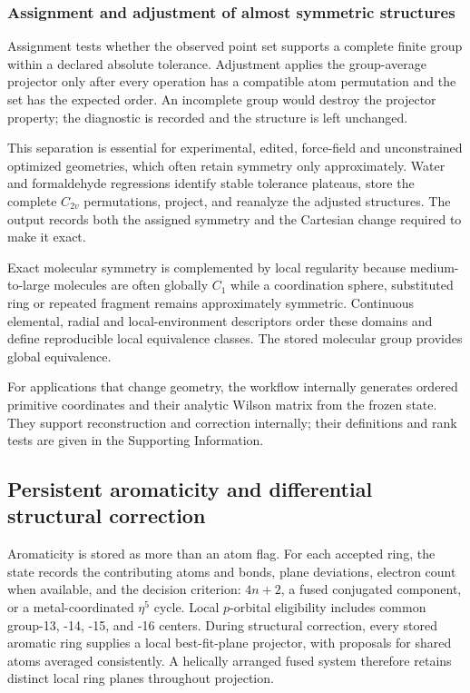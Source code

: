 \documentclass[journal=jctcce,manuscript=article]{achemso}
\begin{document}
\subsubsection{Assignment and adjustment of almost symmetric structures}

Assignment tests whether the observed point set supports a complete finite
group within a declared absolute tolerance.  Adjustment applies the
group-average projector only after every operation has a compatible atom
permutation and the set has the expected order.  An incomplete group would
destroy the projector property; the diagnostic is recorded and the structure
is left unchanged.

This separation is essential for experimental, edited, force-field and
unconstrained optimized geometries, which often retain symmetry only
approximately.  Water and formaldehyde regressions identify stable tolerance
plateaus, store the complete $C_{2v}$ permutations, project, and reanalyze the
adjusted structures.  The output records both the assigned symmetry and the
Cartesian change required to make it exact.

Exact molecular symmetry is complemented by local regularity because
medium-to-large molecules are often globally $C_1$ while a coordination sphere, substituted
ring or repeated fragment remains approximately symmetric.  Continuous
elemental, radial and local-environment descriptors order these
domains and define reproducible local equivalence classes.  The stored
molecular group provides global equivalence.

For applications that change geometry, the workflow internally generates ordered
primitive coordinates and their analytic Wilson matrix from the frozen state.
They support reconstruction and correction internally; their definitions and
rank tests are given in the Supporting Information.

\subsection{Persistent aromaticity and differential structural correction}

Aromaticity is stored as more than an atom flag.  For each accepted ring,
the state records the contributing atoms and bonds, plane deviations, electron
count when available, and the decision criterion: $4n+2$, a fused conjugated
component, or a metal-coordinated $\eta^5$ cycle.  Local $p$-orbital eligibility
includes common group-13, -14, -15, and -16 centers.  During structural
correction, every stored aromatic ring supplies a local best-fit-plane
projector, with proposals for shared atoms averaged consistently.  A helically arranged fused
system therefore retains distinct local ring planes throughout projection.
\end{document}
